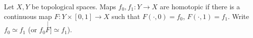 Let $X, Y$ be topological spaces. Maps $f_0, f_1\colon Y\to X$ are homotopic if
there is a continuous map $F\colon Y\times[0, 1]\to X$ such that $F(\cdot, 0) = f_0$,
$F(\cdot, 1) = f_1$. Write $f_0\simeq f_1$ (or $f_0\stackrel[F]{}{\simeq}f_1$).
